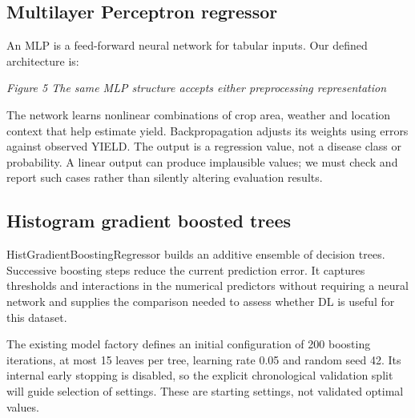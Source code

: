 \documentclass[11pt,a4paper]{article}
\begin{document}
\subsection*{Multilayer Perceptron regressor}
An MLP is a feed-forward neural network for tabular inputs. Our defined architecture is:
\begin{center}
\end{center}
{\footnotesize\itshape Figure 5  The same MLP structure accepts either preprocessing representation}\par
The network learns nonlinear combinations of crop area, weather and location context that help estimate yield. Backpropagation adjusts its weights using errors against observed YIELD. The output is a regression value, not a disease class or probability. A linear output can produce implausible values; we must check and report such cases rather than silently altering evaluation results.

\subsection*{Histogram gradient boosted trees}
HistGradientBoostingRegressor builds an additive ensemble of decision trees. Successive boosting steps reduce the current prediction error. It captures thresholds and interactions in the numerical predictors without requiring a neural network and supplies the comparison needed to assess whether DL is useful for this dataset.

The existing model factory defines an initial configuration of 200 boosting iterations, at most 15 leaves per tree, learning rate 0.05 and random seed 42. Its internal early stopping is disabled, so the explicit chronological validation split will guide selection of settings. These are starting settings, not validated optimal values.
\end{document}
